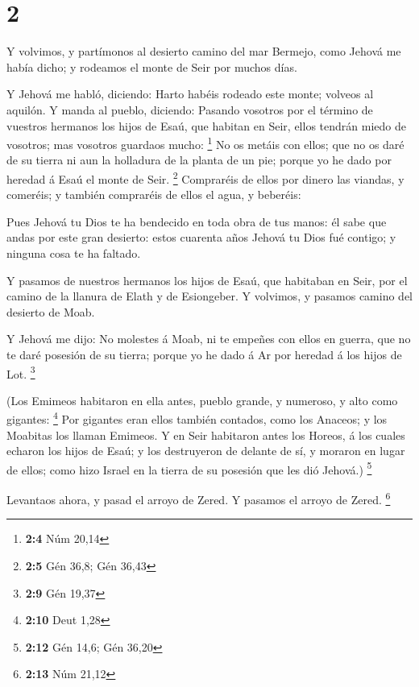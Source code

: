 \hypertarget{section-1}{%
\section{2}\label{section-1}}

 Y volvimos, y partímonos al desierto camino del mar
Bermejo, como Jehová me había dicho; y rodeamos el monte de Seir por
muchos días.

 Y Jehová me habló, diciendo:  Harto habéis
rodeado este monte; volveos al aquilón.  Y manda al
pueblo, diciendo: Pasando vosotros por el término de vuestros hermanos
los hijos de Esaú, que habitan en Seir, ellos tendrán miedo de vosotros;
mas vosotros guardaos mucho: \footnote{\textbf{2:4} Núm 20,14}
 No os metáis con ellos; que no os daré de su tierra ni
aun la holladura de la planta de un pie; porque yo he dado por heredad á
Esaú el monte de Seir. \footnote{\textbf{2:5} Gén 36,8; Gén 36,43}
 Compraréis de ellos por dinero las viandas, y comeréis; y
también compraréis de ellos el agua, y beberéis:

 Pues Jehová tu Dios te ha bendecido en toda obra de tus
manos: él sabe que andas por este gran desierto: estos cuarenta años
Jehová tu Dios fué contigo; y ninguna cosa te ha faltado.

 Y pasamos de nuestros hermanos los hijos de Esaú, que
habitaban en Seir, por el camino de la llanura de Elath y de Esiongeber.
Y volvimos, y pasamos camino del desierto de Moab.

 Y Jehová me dijo: No molestes á Moab, ni te empeñes con
ellos en guerra, que no te daré posesión de su tierra; porque yo he dado
á Ar por heredad á los hijos de Lot. \footnote{\textbf{2:9} Gén 19,37}

 (Los Emimeos habitaron en ella antes, pueblo grande, y
numeroso, y alto como gigantes: \footnote{\textbf{2:10} Deut 1,28}
 Por gigantes eran ellos también contados, como los
Anaceos; y los Moabitas los llaman Emimeos.  Y en Seir
habitaron antes los Horeos, á los cuales echaron los hijos de Esaú; y
los destruyeron de delante de sí, y moraron en lugar de ellos; como hizo
Israel en la tierra de su posesión que les dió Jehová.) \footnote{\textbf{2:12}
  Gén 14,6; Gén 36,20}

 Levantaos ahora, y pasad el arroyo de Zered. Y pasamos
el arroyo de Zered. \footnote{\textbf{2:13} Núm 21,12}

